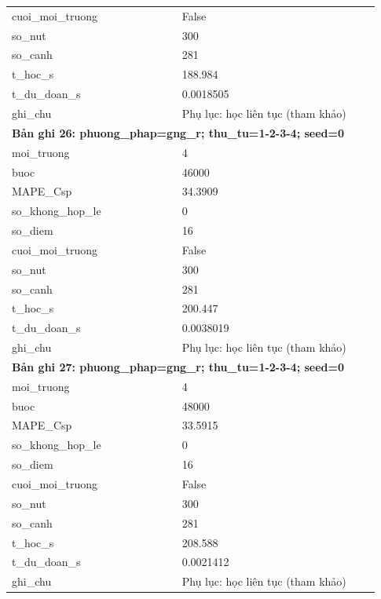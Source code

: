 \begin{longtable}{p{0.43\linewidth}p{0.50\linewidth}}
cuoi\_\allowbreak moi\_\allowbreak truong & False \\
so\_\allowbreak nut & 300 \\
so\_\allowbreak canh & 281 \\
t\_\allowbreak hoc\_\allowbreak s & 188.984 \\
t\_\allowbreak du\_\allowbreak doan\_\allowbreak s & 0.0018505 \\
ghi\_\allowbreak chu & Phụ lục: học liên tục (tham khảo) \\
\midrule
\multicolumn{2}{p{0.95\linewidth}}{\textbf{Bản ghi 26: phuong\_phap=gng\_r; thu\_tu=1-2-3-4; seed=0}} \\
moi\_\allowbreak truong & 4 \\
buoc & 46000 \\
MAPE\_\allowbreak Csp & 34.3909 \\
so\_\allowbreak khong\_\allowbreak hop\_\allowbreak le & 0 \\
so\_\allowbreak diem & 16 \\
cuoi\_\allowbreak moi\_\allowbreak truong & False \\
so\_\allowbreak nut & 300 \\
so\_\allowbreak canh & 281 \\
t\_\allowbreak hoc\_\allowbreak s & 200.447 \\
t\_\allowbreak du\_\allowbreak doan\_\allowbreak s & 0.0038019 \\
ghi\_\allowbreak chu & Phụ lục: học liên tục (tham khảo) \\
\midrule
\multicolumn{2}{p{0.95\linewidth}}{\textbf{Bản ghi 27: phuong\_phap=gng\_r; thu\_tu=1-2-3-4; seed=0}} \\
moi\_\allowbreak truong & 4 \\
buoc & 48000 \\
MAPE\_\allowbreak Csp & 33.5915 \\
so\_\allowbreak khong\_\allowbreak hop\_\allowbreak le & 0 \\
so\_\allowbreak diem & 16 \\
cuoi\_\allowbreak moi\_\allowbreak truong & False \\
so\_\allowbreak nut & 300 \\
so\_\allowbreak canh & 281 \\
t\_\allowbreak hoc\_\allowbreak s & 208.588 \\
t\_\allowbreak du\_\allowbreak doan\_\allowbreak s & 0.0021412 \\
ghi\_\allowbreak chu & Phụ lục: học liên tục (tham khảo) \\

\end{longtable}
